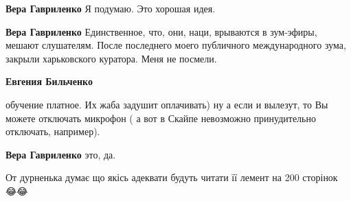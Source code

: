 \begin{itemize}
\begin{itemize}
 
\textbf{Вера Гавриленко} Я подумаю. Это хорошая идея.

 
\textbf{Вера Гавриленко} Единственное, что, они, наци, врываются в зум-эфиры, мешают слушателям. После последнего моего публичного международного зума, закрыли харьковского куратора. Меня не посмели.

 
\textbf{Евгения Бильченко} 

обучение платное. Их жаба задушит оплачивать) ну а если и вылезут, то Вы можете
отключать микрофон ( а вот в Скайпе невозможно принудительно отключать,
например).


 
\textbf{Вера Гавриленко} это, да.
\end{itemize}

 
От дурненька думає що якісь адеквати будуть читати її лемент на 200 сторінок
😂😂

\begin{itemize}
 

\end{itemize}
\end{itemize}
